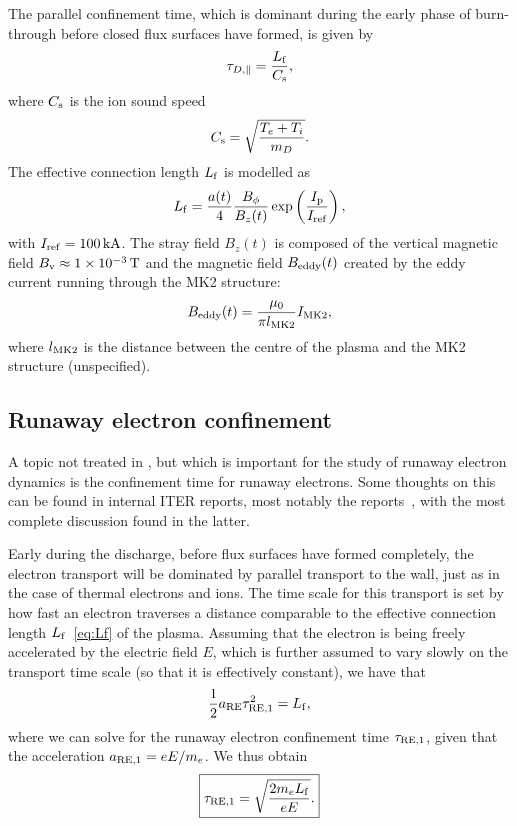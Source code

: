 \documentclass{notes}
\newcommand{\IMK}{I_{\rm MK2}}
\newcommand{\Ip}{I_{\rm p}}
\begin{document}
    The parallel confinement time, which is dominant during the early phase of
    burn-through before closed flux surfaces have formed, is given by
    \begin{equation}
        \tau_{D,\|} = \frac{L_{\rm f}}{C_{\rm s}},
    \end{equation}
    where $C_{\rm s}$ is the ion sound speed
    \begin{equation}
        C_{\rm s} = \sqrt{\frac{T_e + T_i}{m_D}}.
    \end{equation}
    The effective connection length $L_{\rm f}$ is modelled as
    \begin{equation}\label{eq:Lf}
        L_{\rm f} = \frac{a(t)}{4}\frac{B_\phi}{B_z(t)}\exp\left( \frac{\Ip}{I_{\rm ref}} \right),
    \end{equation}
    with $I_{\rm ref} = \SI{100}{kA}$. The stray field $B_z(t)$ is composed of
    the vertical magnetic field $B_{\rm v}\approx\SI{1e-3}{T}$ and the magnetic
    field $B_{\rm eddy}(t)$ created by the eddy current running through the MK2
    structure:
    \begin{equation}
        B_{\rm eddy}(t) = \frac{\mu_0}{\pi l_{\rm MK2}}\IMK,
    \end{equation}
    where $l_{\rm MK2}$ is the distance between the centre of the plasma and
    the MK2 structure (unspecified).

    \subsection{Runaway electron confinement}
    A topic not treated in \DYON, but which is important for the study of
    runaway electron dynamics is the confinement time for runaway electrons.
    Some thoughts on this can be found in internal ITER reports, most notably
    the reports~\cite{Putvinski2010,Kavin2017,Mineev2021}, with the most
    complete discussion found in the latter.

    Early during the discharge, before flux surfaces have formed completely,
    the electron transport will be dominated by parallel transport to the wall,
    just as in the case of thermal electrons and ions. The time scale for this
    transport is set by how fast an electron traverses a distance comparable to
    the effective connection length $L_{\rm f}$~\eqref{eq:Lf} of the plasma.
    Assuming that the electron is being freely accelerated by the electric
    field $E$, which is further assumed to vary slowly on the transport time
    scale (so that it is effectively constant), we have that
    \begin{equation}
        \frac{1}{2}a_{\rm RE}\tau_{\rm RE,1}^2 = L_{\rm f},
    \end{equation}
    where we can solve for the runaway electron confinement time
    $\tau_{\rm RE,1}$, given that the acceleration $a_{\rm RE,1}=eE/m_e$.
    We thus obtain
    \begin{equation}
        \boxed{
            \tau_{\rm RE,1} = \sqrt{\frac{2m_eL_{\rm f}}{eE}}.
        }
    \end{equation}
\end{document}
